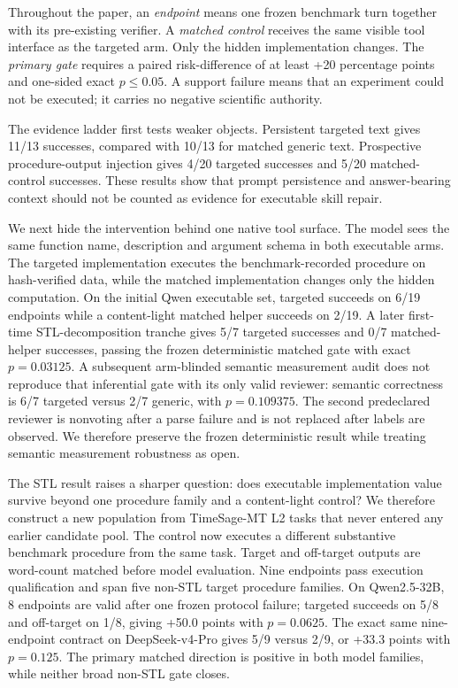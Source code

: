 Throughout the paper, an \emph{endpoint} means one frozen benchmark turn together with its pre-existing verifier. A \emph{matched control} receives the same visible tool interface as the targeted arm. Only the hidden implementation changes. The \emph{primary gate} requires a paired risk-difference of at least +20 percentage points and one-sided exact $p\leq0.05$. A support failure means that an experiment could not be executed; it carries no negative scientific authority.

The evidence ladder first tests weaker objects. Persistent targeted text gives 11/13 successes, compared with 10/13 for matched generic text. Prospective procedure-output injection gives 4/20 targeted successes and 5/20 matched-control successes. These results show that prompt persistence and answer-bearing context should not be counted as evidence for executable skill repair.

We next hide the intervention behind one native tool surface. The model sees the same function name, description and argument schema in both executable arms. The targeted implementation executes the benchmark-recorded procedure on hash-verified data, while the matched implementation changes only the hidden computation. On the initial Qwen executable set, targeted succeeds on 6/19 endpoints while a content-light matched helper succeeds on 2/19. A later first-time STL-decomposition tranche gives 5/7 targeted successes and 0/7 matched-helper successes, passing the frozen deterministic matched gate with exact $p=0.03125$. A subsequent arm-blinded semantic measurement audit does not reproduce that inferential gate with its only valid reviewer: semantic correctness is 6/7 targeted versus 2/7 generic, with $p=0.109375$. The second predeclared reviewer is nonvoting after a parse failure and is not replaced after labels are observed. We therefore preserve the frozen deterministic result while treating semantic measurement robustness as open.

The STL result raises a sharper question: does executable implementation value survive beyond one procedure family and a content-light control? We therefore construct a new population from TimeSage-MT L2 tasks that never entered any earlier candidate pool. The control now executes a different substantive benchmark procedure from the same task. Target and off-target outputs are word-count matched before model evaluation. Nine endpoints pass execution qualification and span five non-STL target procedure families. On Qwen2.5-32B, 8 endpoints are valid after one frozen protocol failure; targeted succeeds on 5/8 and off-target on 1/8, giving +50.0 points with $p=0.0625$. The exact same nine-endpoint contract on DeepSeek-v4-Pro gives 5/9 versus 2/9, or +33.3 points with $p=0.125$. The primary matched direction is positive in both model families, while neither broad non-STL gate closes.

